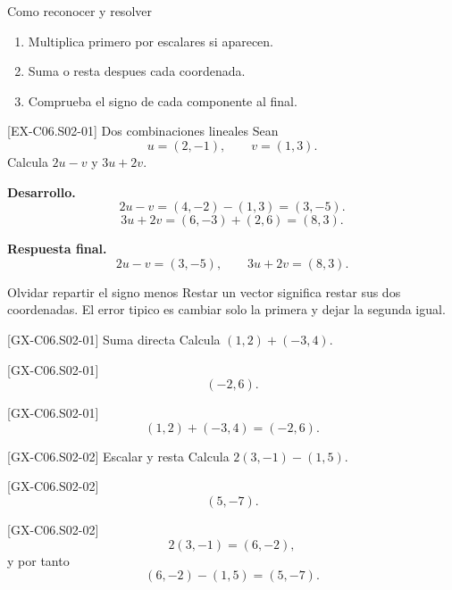 \begin{methodbox}{Como reconocer y resolver}
\begin{enumerate}
  \item Multiplica primero por escalares si aparecen.
  \item Suma o resta despues cada coordenada.
  \item Comprueba el signo de cada componente al final.
\end{enumerate}
\end{methodbox}

\begin{solvedexample}{[EX-C06.S02-01] Dos combinaciones lineales}
Sean
\[
u=(2,-1),\qquad v=(1,3).
\]
Calcula \(2u-v\) y \(3u+2v\).

\textbf{Desarrollo.}
\[
2u-v=(4,-2)-(1,3)=(3,-5).
\]
\[
3u+2v=(6,-3)+(2,6)=(8,3).
\]

\textbf{Respuesta final.}
\[
2u-v=(3,-5),
\qquad
3u+2v=(8,3).
\]
\end{solvedexample}

\begin{commonerror}{Olvidar repartir el signo menos}
Restar un vector significa restar sus dos coordenadas. El error tipico es cambiar solo la
primera y dejar la segunda igual.
\end{commonerror}

\begin{guidedexercise}{[GX-C06.S02-01] Suma directa}
Calcula \((1,2)+(-3,4)\).
\end{guidedexercise}

\begin{shortanswer}{[GX-C06.S02-01]}
\[
(-2,6).
\]
\end{shortanswer}

\begin{fullsolution}{[GX-C06.S02-01]}
\[
(1,2)+(-3,4)=(-2,6).
\]
\end{fullsolution}

\begin{guidedexercise}{[GX-C06.S02-02] Escalar y resta}
Calcula \(2(3,-1)-(1,5)\).
\end{guidedexercise}

\begin{shortanswer}{[GX-C06.S02-02]}
\[
(5,-7).
\]
\end{shortanswer}

\begin{fullsolution}{[GX-C06.S02-02]}
\[
2(3,-1)=(6,-2),
\]
y por tanto
\[
(6,-2)-(1,5)=(5,-7).
\]
\end{fullsolution}

